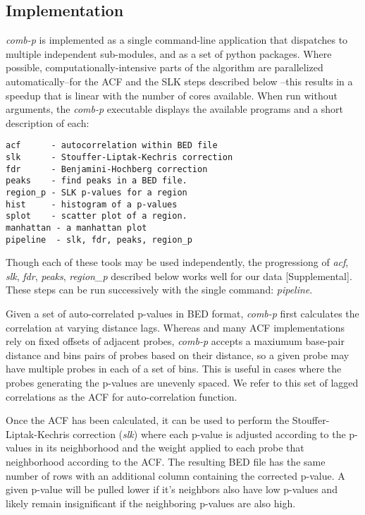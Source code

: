 \documentclass{bioinfo}
\begin{document}
\begin{methods}

\section{Implementation}

\textit{comb-p} is implemented as a single command-line application that
dispatches to multiple independent sub-modules, and as a set of python
packages. Where possible, computationally-intensive parts of the algorithm
are parallelized automatically--for the ACF and the SLK steps described below
--this results in a speedup that is linear with the number of cores available.
When run without arguments, the \textit{comb-p} executable displays the
available programs and a short description of each:
\begin{verbatim}
acf      - autocorrelation within BED file
slk      - Stouffer-Liptak-Kechris correction
fdr      - Benjamini-Hochberg correction
peaks    - find peaks in a BED file.
region_p - SLK p-values for a region
hist     - histogram of a p-values
splot    - scatter plot of a region.
manhattan - a manhattan plot
pipeline  - slk, fdr, peaks, region_p
\end{verbatim}
Though each of these tools may be used independently, the progressiong of
\textit{acf}, \textit{slk}, \textit{fdr}, \textit{peaks}, \textit{region\_p}
described below works well for our data [Supplemental]. These steps can
be run successively with the single command: \textit{pipeline}.

Given a set of auto-correlated p-values in BED format, \textit{comb-p} first
calculates the correlation at varying distance lags. Whereas \citep{Kechris2010}
and many ACF implementations rely on fixed offsets of adjacent probes,
\textit{comb-p} accepts a maxiumum base-pair distance and bins pairs of probes
based on their distance, so a given probe may have multiple probes in each of
a set of bins. This is useful in cases where the probes generating the p-values
are unevenly spaced. We refer to this set of lagged correlations as the ACF for
auto-correlation function.

Once the ACF has been calculated, it can be used to perform the
Stouffer-Liptak-Kechris correction (\textit{slk}) where each p-value is
adjusted according to the p-values in its neighborhood and the weight applied
to each probe that neighborhood according to the ACF. The resulting BED file
has the same number of rows with an additional column containing the corrected
p-value. A given p-value will be pulled lower if it's neighbors also have low
p-values and likely remain insignificant if the neighboring p-values are also 
high.


\end{methods}
\end{document}
